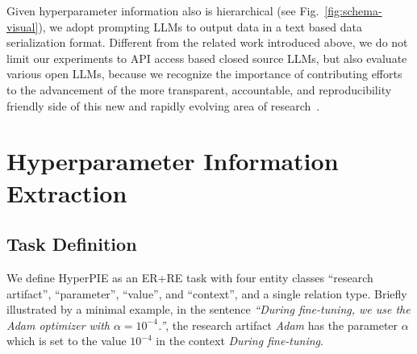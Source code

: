 Given hyperparameter information also is hierarchical (see Fig.~\ref{fig:schema-visual}), we adopt prompting LLMs to output data in a text based data serialization format. Different from the related work introduced above, we do not limit our experiments to API access based closed source LLMs, but also evaluate various open LLMs, because we recognize the importance of contributing efforts to the advancement of the more transparent, accountable, and reproducibility friendly side of this new and rapidly evolving area of research~\cite{Liesenfeld2023}.


\section{Hyperparameter Information Extraction}\label{sec:hyperpie}


\subsection{Task Definition}


We define HyperPIE as an ER+RE task with four entity classes ``research artifact'', ``parameter'', ``value'', and ``context'', and a single relation type. Briefly illustrated by a minimal example, in the sentence \textit{``During fine-tuning, we use the Adam optimizer with $\mathit{\alpha=10^{-4}}$.''}, the research artifact \textit{Adam} has the parameter $\mathit{\alpha}$ which is set to the value $\mathit{10^{-4}}$ in the context \textit{During fine-tuning}.

